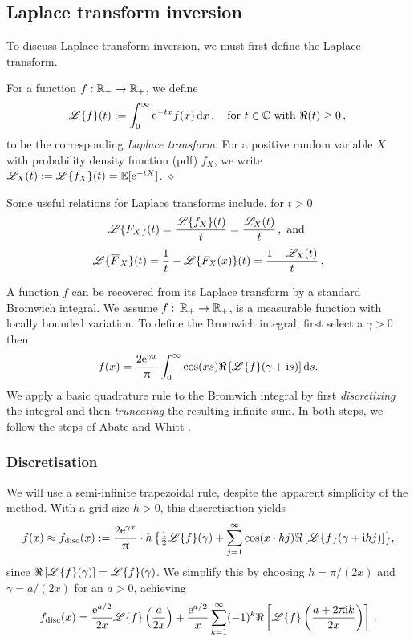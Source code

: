 \subsection{Laplace transform inversion} \label{sec:laplace_inversion}

To discuss Laplace transform inversion, we must first define the Laplace transform.

\begin{definition} \label{def:TransformDefs} For a function $f : \mathbb{R}_+ \to \mathbb{R}_+$, we define
\[
	\mathscr{L}\{f\}(t) := \int_{0}^{\infty} \mathrm{e}^{-t x} f(x) \mathop{}\!\mathrm{d} x\,, \quad \text{for } t \in \mathbb{C} \text{ with } \Re(t) \ge 0 \,, \\
\]
to be the corresponding \emph{Laplace transform}.
For a positive random variable $X$ with probability density function (pdf) $f_X$, we write $\mathscr{L}_{X}(t) := \mathscr{L}\{f_X\}(t) = \operatorname{{\mathbb E}}[\mathrm{e}^{-tX}]$. \hfill $\diamond$
\end{definition}
Some useful relations for Laplace transforms include, for $t>0$
\[ \mathscr{L}\{ F_X \}(t) = \frac{\mathscr{L}\{f_X\}(t)}{t} = \frac{\mathscr{L}_{X}(t)}{t} \,, \text{ and } \]
\[ \LT{ \Ftail_X }(t) = \frac1t - \LT{F_X(x) }(t) = \frac{1 - \LTsub{X}(t)}{t}  \,. \]

A function $f$ can be recovered from its Laplace transform by a standard Bromwich integral.
We assume $f:\,\mathbb{R}_+ \to \mathbb{R}_+$, is a measurable function with locally bounded variation.
To define the Bromwich integral, first select a $\gamma > 0$ then
\[
f(x)=\frac{2\mathrm{e}^{\gamma x}}{\uppi}\int_{0}^{\infty}\cos(xs)\Re\left[\mathscr{L}\{f\}(\gamma + \mathrm{i} s)\right]\mathop{}\!\mathrm{d} s.
\]
We apply a basic quadrature rule to the Bromwich integral by first \emph{discretizing} the integral and then \emph{truncating} the resulting infinite sum. In both steps, we follow the steps of Abate and Whitt \cite{Abate1992}.

\subsubsection{Discretisation} \label{Sub:Discretization}

We will use a semi-infinite trapezoidal rule, despite the apparent simplicity of the method.
With a grid size $h>0$, this discretisation yields
\[
f(x) \approx f_{\text{disc}}(x) := \frac{2\mathrm{e}^{\gamma x}}{\uppi} \cdot h \, \bigl \{ \tfrac12 \mathscr{L}\{f\}(\gamma) + \sum_{j=1}^\infty  \cos(x \cdot hj)\Re\left[\mathscr{L}\{f\}(\gamma + \mathrm{i} hj)\right] \bigr \},
\]
since  $\Re\left[\mathscr{L}\{f\}(\gamma)\right] = \mathscr{L}\{f\}(\gamma)$. We simplify this by choosing $h = \pi/(2 x)$ and $\gamma = a / (2 x)$ for an $a > 0$, achieving
\begin{equation} \label{DiscretizedInversion}
f_{\text{disc}}(x) = \frac{\mathrm{e}^{a/2}}{2x}\mathscr{L}\{f\} \left(\frac{a}{2 x}\right) + \frac{\mathrm{e}^{a/2}}{x} \sum_{k=1}^\infty (-1)^{k} \Re\left[\mathscr{L}\{f\}\left(\frac{a+ 2\uppi \mathrm{i} k}{2 x}\right)\right] \,.
\end{equation}


